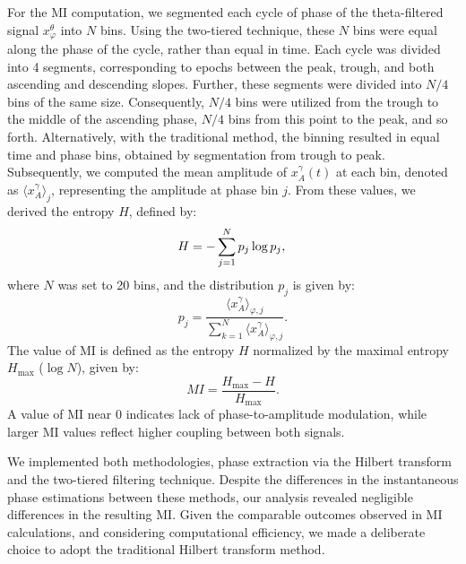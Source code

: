 \documentclass[../main.tex]{subfiles}
\begin{document}
For the MI computation, we segmented each cycle of phase of the theta-filtered signal $x^{\theta}_{\varphi}$ into $N$ bins. 
Using the two-tiered technique, these $N$ bins were equal along the phase of the cycle, rather than equal in time.
Each cycle was divided into 4 segments, corresponding to epochs between the peak, trough, and both ascending and descending slopes.
Further, these segments were divided into $N/4$ bins of the same size. Consequently, $N/4$ bins were utilized from the trough to the middle of the ascending phase, $N/4$ bins from this point to the peak, and so forth.
Alternatively, with the traditional method, the binning resulted in equal time and phase bins, obtained by segmentation from trough to peak.
Subsequently, we computed the mean amplitude of $x^{\gamma}_A(t)$ at each bin, denoted as $\langle x^{\gamma}_A\rangle_{j}$, representing the amplitude at phase bin $j$. 
From these values, we derived the entropy $H$, defined by:
\begin{equation}
    H = -\displaystyle\sum_{j=1}^{N}p_j \log p_j,\\
    \label{eq:entropy}
\end{equation}
where $N$ was set to 20 bins, and the distribution $p_j$ is given by: 
\begin{equation}
    p_j = \displaystyle\frac{\langle x^{\gamma}_A \rangle_{\varphi,j}}{\displaystyle\sum_{k=1}^{N}\langle x^{\gamma}_A \rangle_{\varphi,j}}.
    \label{eq:amplitude-probability}
\end{equation}
The value of MI is defined as the entropy $H$ normalized by the maximal entropy $H_\text{max}$ ($\log N$), given by:
\clearpage
\begin{equation}
    MI = \displaystyle\frac{H_\text{max}-H}{H_\text{max}}.
    \label{eq:modulation-index}
\end{equation}
A value of MI near 0 indicates lack of phase-to-amplitude modulation, while larger MI values reflect higher coupling between both signals.

We implemented both methodologies, phase extraction via the Hilbert transform and the two-tiered filtering technique.
Despite the differences in the instantaneous phase estimations between these methods, our analysis revealed negligible differences in the resulting MI.
Given the comparable outcomes observed in MI calculations, and considering computational efficiency, we made a deliberate choice to adopt the traditional Hilbert transform method.


\end{document}
